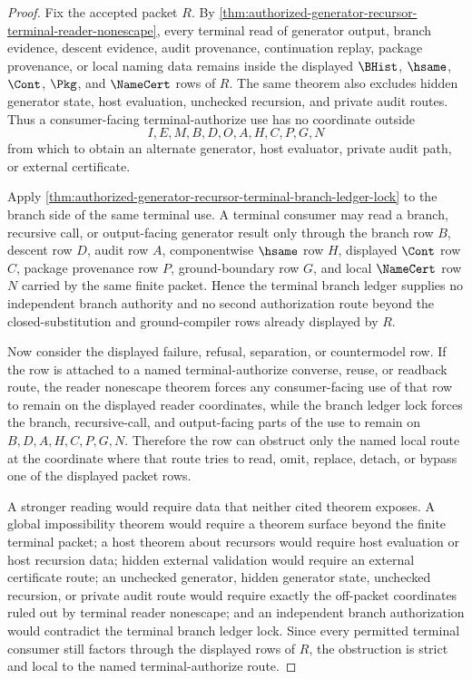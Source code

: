 \begin{proof}
Fix the accepted packet $R$. By \autoref{thm:authorized-generator-recursor-terminal-reader-nonescape}, every terminal read of generator output, branch evidence, descent evidence, audit provenance, continuation replay, package provenance, or local naming data remains inside the displayed $\BHist$, $\hsame$, $\Cont$, $\Pkg$, and $\NameCert$ rows of $R$. The same theorem also excludes hidden generator state, host evaluation, unchecked recursion, and private audit routes. Thus a consumer-facing terminal-authorize use has no coordinate outside
$$
I,E,M,B,D,O,A,H,C,P,G,N
$$
from which to obtain an alternate generator, host evaluator, private audit path, or external certificate.

Apply \autoref{thm:authorized-generator-recursor-terminal-branch-ledger-lock} to the branch side of the same terminal use. A terminal consumer may read a branch, recursive call, or output-facing generator result only through the branch row $B$, descent row $D$, audit row $A$, componentwise $\hsame$ row $H$, displayed $\Cont$ row $C$, package provenance row $P$, ground-boundary row $G$, and local $\NameCert$ row $N$ carried by the same finite packet. Hence the terminal branch ledger supplies no independent branch authority and no second authorization route beyond the closed-substitution and ground-compiler rows already displayed by $R$.

Now consider the displayed failure, refusal, separation, or countermodel row. If the row is attached to a named terminal-authorize converse, reuse, or readback route, the reader nonescape theorem forces any consumer-facing use of that row to remain on the displayed reader coordinates, while the branch ledger lock forces the branch, recursive-call, and output-facing parts of the use to remain on $B,D,A,H,C,P,G,N$. Therefore the row can obstruct only the named local route at the coordinate where that route tries to read, omit, replace, detach, or bypass one of the displayed packet rows.

A stronger reading would require data that neither cited theorem exposes. A global impossibility theorem would require a theorem surface beyond the finite terminal packet; a host theorem about recursors would require host evaluation or host recursion data; hidden external validation would require an external certificate route; an unchecked generator, hidden generator state, unchecked recursion, or private audit route would require exactly the off-packet coordinates ruled out by terminal reader nonescape; and an independent branch authorization would contradict the terminal branch ledger lock. Since every permitted terminal consumer still factors through the displayed rows of $R$, the obstruction is strict and local to the named terminal-authorize route.
\end{proof}
